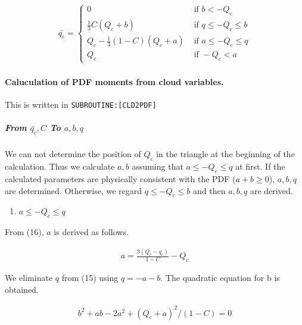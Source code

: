 \begin{eqnarray}
\bar{q_c}=\left\{\begin{array}{ll}
0 & \text { if } b<-Q_{c} \\
\frac{1}{3} C\left(Q_{c}+b\right) & \text { if } q \leq-Q_{c} \leq b \\
Q_{c}-\frac{1}{3}(1-C)\left(Q_{c}+a\right) & \text { if } a \leq-Q_{c} \leq q \\
Q_{c} & \text { if }-Q_{c}<a
\end{array}\right.
\label{E08-16}
\end{eqnarray}

\hypertarget{caluculation-of-pdf-moments-from-cloud-variables.}{%
\paragraph{Caluculation of PDF moments from cloud
variables.}\label{caluculation-of-pdf-moments-from-cloud-variables.}}

This is written in \texttt{SUBROUTINE:{[}CLD2PDF{]}}

\hypertarget{from-barq_c-c-to-abq}{%
\subparagraph{\texorpdfstring{From \(\bar{q_c}, C\) To
\(a,b,q\)}{From \textbackslash bar\{q\_c\}, C To a,b,q}}\label{from-barq_c-c-to-abq}}

We can not determine the position of \(Q_c\) in the triangle at the
beginning of the calculation. Thus we calculate \(a,b\) assuming that
\(a \leq-Q_{c} \leq q\) at first. If the calculated parameters are
physically consistent with the PDF (\(a+b \ge 0\)), \(a,b,q\) are
determined. Otherwise, we regard \(q \leq-Q_{c} \leq b\) and then
\(a,b,q\) are derived.

\begin{enumerate}
\def\labelenumi{\arabic{enumi}.}
\tightlist
\item
  \(a \leq-Q_{c} \leq q\)
\end{enumerate}

From (16), \(a\) is derived as follows.

\begin{eqnarray}
a =\frac{3\left(Q_{c}-q_{c}\right)}{1-C}-Q_{c}
\end{eqnarray}

We eliminate \(q\) from (15) using \(q = -a-b\). The quadratic equation
for b is obtained.

\begin{eqnarray}
b^{2}+ab-2a^{2}+\left(Q_{c}+a\right)^{2} /(1-C)=0
\label{E08-17}
\end{eqnarray}

